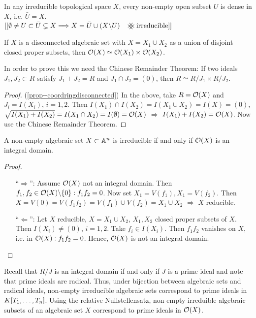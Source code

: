\documentclass[a4paper,11pt]{article}
\begin{document}
			\begin{remark}
				In any irreducible topological space $X$, every non-empty open subset $U$ is dense in $X$, i.e. $\bar{U}=X$.\\$[[\emptyset\neq U\subset\bar{U}\subsetneq X\Longrightarrow X=\bar{U}\cup(X\backslash U)\,\contradiction \text{ irreducible}]]$
			\end{remark}

			\begin{prop}\label{prop--coordringdisconnected}
				If $X$ is a disconnected algebraic set with $X=X_1\cup X_2$ as a union of disjoint closed proper subsets, then $\O(X)\simeq\O(X_1)\times\O(X_2)$.
			\end{prop}

			In order to prove this we need the Chinese Remainder Theorem: If two ideals $J_1,J_2\subset R$ satisfy $J_1+J_2=R$ and $J_1\cap J_2=(0)$, then $R\simeq R/J_1\times R/J_2$.

			\begin{proof}(\autoref{prop--coordringdisconnected})
				In the above, take $R=\O(X)$ and $J_i=I(X_i)$, $i=1,2$. Then $I(X_1)\cap I(X_2)=I(X_1\cup X_2)=I(X)=(0)$, $\sqrt{I(X_1)+I(X_2)}=I(X_1\cap X_2)=I(\emptyset)=\O(X)$ $\Longrightarrow$ $I(X_1)+I(X_2)=\O(X)$. Now use the Chinese Remainder Theorem.
			\end{proof}

			\begin{prop}
				A non-empty algebraic set $X\subset\AA^n$ is irreducible if and only if $\O(X)$ is an integral domain.
			\end{prop}
			\begin{proof}
				\begin{enumerate}
					\item[``$\Rightarrow$'':] Assume $\O(X)$ not an integral domain. Then $f_1,f_2\in\O(X)\backslash\{0\}: f_1f_2=0$. Now set $X_1=V(f_1),X_1=V(f_2)$. Then $X=V(0)=V(f_1f_2)=V(f_1)\cup V(f_2)=X_1\cup X_2$ $\Longrightarrow$ $X$ reducible.
					\item[``$\Leftarrow$'':] Let $X$ reducible, $X=X_1\cup X_2$, $X_1,X_2$ closed proper subsets of $X$. Then $I(X_i)\neq (0)$, $i=1,2$. Take $f_i\in I(X_i)$. Then $f_1f_2$ vanishes on $X$, i.e. in $\O(X):f_1f_2=0$. Hence, $\O(X)$ is not an integral domain. 
				\end{enumerate}
			\end{proof}

			\begin{remark}
				Recall that $R/J$ is an integral domain if and only if $J$ is a prime ideal and note that prime ideals are radical. Thus, under bijection between algebraic sets and radical ideals, non-empty irreducible algebraic sets correspond to prime ideals in $\K$. Using the relative Nullstellensatz, non-empty irreduible algebraic subsets of an algebraic set $X$ correspond to prime ideals in $\O(X)$.
			\end{remark}
\end{document}
